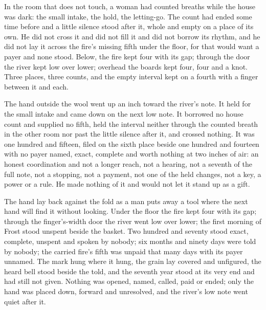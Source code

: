\scenebreak

In the room that does not touch, a woman had counted breaths while the house was dark: the small intake, the hold, the letting-go. The count had ended some time before and a little silence stood after it, whole and empty on a place of its own. He did not cross it and did not fill it and did not borrow its rhythm, and he did not lay it across the fire's missing fifth under the floor, for that would want a payer and none stood. Below, the fire kept four with its gap; through the door the river kept low over lower; overhead the boards kept four, four and a knot. Three places, three counts, and the empty interval kept on a fourth with a finger between it and each.

The hand outside the wool went up an inch toward the river's note. It held for the small intake and came down on the next low note. It borrowed no house count and supplied no fifth, held the interval neither through the counted breath in the other room nor past the little silence after it, and crossed nothing. It was one hundred and fifteen, filed on the sixth place beside one hundred and fourteen with no payer named, exact, complete and worth nothing at two inches of air: an honest coordination and not a longer reach, not a hearing, not a seventh of the full note, not a stopping, not a payment, not one of the held changes, not a key, a power or a rule. He made nothing of it and would not let it stand up as a gift.

The hand lay back against the fold as a man puts away a tool where the next hand will find it without looking. Under the floor the fire kept four with its gap; through the finger's-width door the river went low over lower; the first morning of Frost stood unspent beside the basket. Two hundred and seventy stood exact, complete, unspent and spoken by nobody; six months and ninety days were told by nobody; the carried fire's fifth was unpaid that many days with its payer unnamed. The mark hung where it hung, the grain lay covered and unfigured, the heard bell stood beside the told, and the seventh year stood at its very end and had still not given. Nothing was opened, named, called, paid or ended; only the hand was placed down, forward and unresolved, and the river's low note went quiet after it.
